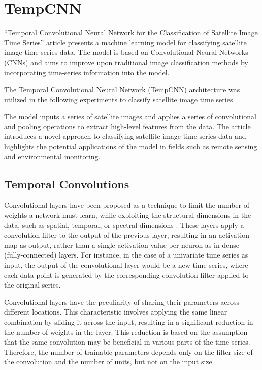 \section{TempCNN}

``Temporal Convolutional Neural Network for the Classification of Satellite Image Time Series'' article \cite{tempCNN} presents a machine learning model for classifying satellite image time series data.
The model is based on Convolutional Neural Networks (CNNs) and aims to improve upon traditional image classification methods by incorporating time-series information into the model.

The Temporal Convolutional Neural Network (TempCNN) architecture was utilized in the following experiments to classify satellite image time series.

The model inputs a series of satellite images and applies a series of convolutional and pooling operations to extract high-level features from the data.
The article introduces a novel approach to classifying satellite image time series data and highlights the potential applications of the model in fields such as remote sensing and environmental monitoring.

\subsection{Temporal Convolutions}

Convolutional layers have been proposed as a technique to limit the number of weights a network must learn, while exploiting the structural dimensions in the data, such as spatial, temporal, or spectral dimensions \cite{NIPS1989_53c3bce6}. 
These layers apply a convolution filter to the output of the previous layer, resulting in an activation map as output, rather than a single activation value per neuron as in dense (fully-connected) layers.
For instance, in the case of a univariate time series as input, the output of the convolutional layer would be a new time series, where each data point is generated by the corresponding convolution filter applied to the original series.

Convolutional layers have the peculiarity of sharing their parameters across different locations.
This characteristic involves applying the same linear combination by sliding it across the input, resulting in a significant reduction in the number of weights in the layer. 
This reduction is based on the assumption that the same convolution may be beneficial in various parts of the time series.
Therefore, the number of trainable parameters depends only on the filter size of the convolution and the number of units, but not on the input size.

